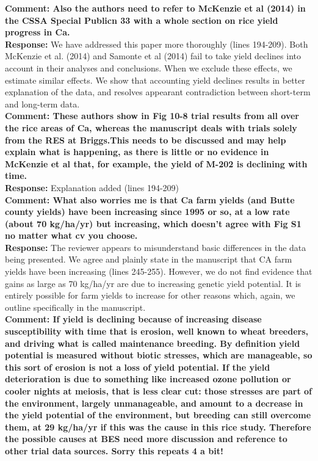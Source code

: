 \documentclass{article} \usepackage[margin=1in]{geometry}
\begin{document}
\textbf{Comment: Also the authors need to refer to McKenzie et al
  (2014) in the CSSA Special Publicn 33 with a whole section on rice
  yield progress in Ca.}\\

\textbf{Response:} We have addressed this paper more
thoroughly (lines 194-209). Both McKenzie et al. (2014) and Samonte et
al (2014) fail to take yield declines into account in their analyses
and conclusions.  When we exclude these effects, we estimate similar
effects. We show that accounting yield declines results in better
explanation of the data, and resolves appearant contradiction between
short-term and long-term data. \\

\textbf{Comment: These authors show in Fig 10-8 trial results from all
  over the rice areas of Ca, whereas the manuscript deals with trials
  solely from the RES at Briggs.This needs to be discussed and may
  help explain what is happening, as there is little or no evidence in
  McKenzie et al that, for example, the yield of M-202 is declining
  with time.}\\

\textbf{Response:} Explanation added (lines 194-209)\\

\textbf{Comment: What also worries me is that Ca farm yields (and
  Butte county yields) have been increasing since 1995 or so, at a low
  rate (about 70 kg/ha/yr) but increasing, which doesn’t agree with
  Fig S1 no matter what cv you choose.}\\

\textbf{Response:} The reviewer appears to misunderstand basic
differences in the data being presented. We agree and plainly state in
the manuscript that CA farm yields have been increasing (lines
245-255). However, we do not find evidence that gains as large as 70
kg/ha/yr are due to increasing genetic yield potential. It is entirely
possible for farm yields to increase for other reasons which, again,
we outline specifically in the manuscript.\\

\textbf{Comment: If yield is declining because of increasing disease
  susceptibility with time that is erosion, well known to wheat
  breeders, and driving what is called maintenance breeding. By
  definition yield potential is measured without biotic stresses,
  which are manageable, so this sort of erosion is not a loss of yield
  potential. If the yield deterioration is due to something like
  increased ozone pollution or cooler nights at meiosis, that is less
  clear cut: those stresses are part of the environment, largely
  unmanageable, and amount to a decrease in the yield potential of the
  environment, but breeding can still overcome them, at 29 kg/ha/yr if
  this was the cause in this rice study. Therefore the possible causes
  at BES need more discussion and reference to other trial data
  sources. Sorry this repeats 4 a bit!}\\
\end{document}
